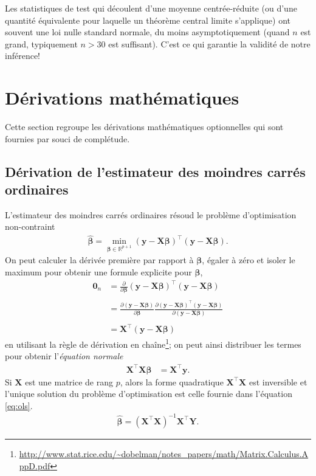 \documentclass[
  11pt,
  letterpaper,
]{article}
\renewcommand{\href}[2]{#2\footnote{\url{#1}}}
\theoremstyle{definition}
\theoremstyle{definition}
\theoremstyle{definition}
\theoremstyle{remark}
\begin{document}
Les statistiques de test qui découlent d'une moyenne centrée-réduite (ou d'une quantité équivalente pour laquelle un théorème central limite s'applique) ont souvent une loi nulle standard normale, du moins asymptotiquement (quand \(n\) est grand, typiquement \(n>30\) est suffisant). C'est ce qui garantie la validité de notre inférence!

\hypertarget{math}{%
\section{Dérivations mathématiques}\label{math}}

Cette section regroupe les dérivations mathématiques optionnelles qui sont fournies par souci de complétude.

\hypertarget{ols}{%
\subsection{Dérivation de l'estimateur des moindres carrés ordinaires}\label{ols}}

L'estimateur des moindres carrés ordinaires résoud le problème d'optimisation non-contraint
\begin{align*}
\widehat{\boldsymbol{\beta}}=\min_{\boldsymbol{\beta} \in \mathbb{R}^{p+1}}(\boldsymbol{y}-\mathbf{X}\boldsymbol{\beta})^\top(\boldsymbol{y}-\mathbf{X}\boldsymbol{\beta}).
\end{align*}
On peut calculer la dérivée première par rapport à \(\boldsymbol{\beta}\), égaler à zéro et isoler le maximum pour obtenir une formule explicite pour \(\widehat{\boldsymbol{\beta}}\),\\
\begin{align*}
\mathbf{0}_n&=\frac{\partial}{\partial\boldsymbol{\beta}}(\boldsymbol{y}-\mathbf{X}\boldsymbol{\beta})^\top(\boldsymbol{y}-\mathbf{X}\boldsymbol{\beta})\\
\\&=\frac{\partial (\boldsymbol{y}-\mathbf{X}\boldsymbol{\beta})}{\partial \boldsymbol{\beta}}\frac{\partial (\boldsymbol{y}-\mathbf{X}\boldsymbol{\beta})^\top(\boldsymbol{y}-\mathbf{X}\boldsymbol{\beta})}{\partial (\boldsymbol{y}-\mathbf{X}\boldsymbol{\beta})}\\
 \\&=\mathbf{X}^\top (\boldsymbol{y}-\mathbf{X}\boldsymbol{\beta})
\end{align*}
en utilisant la \href{http://www.stat.rice.edu/~dobelman/notes_papers/math/Matrix.Calculus.AppD.pdf}{règle de dérivation en chaîne}; on peut ainsi distribuer les termes pour obtenir l'\emph{équation normale}
\begin{align*}
 \mathbf{X}^\top \mathbf{X}\boldsymbol{\beta}&=\mathbf{X}^\top \boldsymbol{y}.
\end{align*}
Si \(\mathbf{X}\) est une matrice de rang \(p\), alors la forme quadratique \(\mathbf{X}^\top \mathbf{X}\) est inversible et l'unique solution du problème d'optimisation est celle fournie dans l'équation \eqref{eq:ols}.
\begin{align*}
\widehat{\boldsymbol{\beta}} = (\mathbf{X}^{\top} \mathbf{X})^{-1} \mathbf{X}^{\top} \boldsymbol{Y}.
\end{align*}
\end{document}
